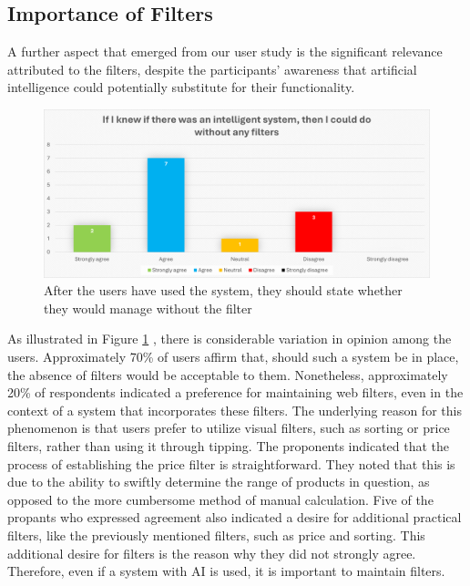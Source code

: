 \documentclass[../../submission.tex]{subfiles}
\begin{document}
 \subsection{Importance of Filters}
A further aspect that emerged from our user study is the significant relevance 
attributed to the filters, despite the participants' awareness that artificial 
intelligence could potentially substitute for their functionality.

 \begin{figure}[h]
    \includegraphics[width=\textwidth]{images/without_filter}
    \caption{After the users have used the system, they should state whether they would manage without the filter}
    \Description{}
    \label{fig:without_filter}
 \end{figure}

 As illustrated in Figure \ref{fig:without_filter} , there is considerable variation in opinion among 
 the users. Approximately 70\% of users affirm that, should such a system be 
 in place, the absence of filters would be acceptable to them. Nonetheless, 
 approximately 20\% of respondents indicated a preference for maintaining web 
 filters, even in the context of a system that incorporates these filters. 
 The underlying reason for this phenomenon is that users prefer to utilize visual 
 filters, such as sorting or price filters, rather than using it through tipping. 
 The proponents indicated that the process of establishing the price filter is 
 straightforward. They noted that this is due to the ability to swiftly determine 
 the range of products in question, as opposed to the more cumbersome method of 
 manual calculation. Five of the propants who expressed agreement also indicated 
 a desire for additional practical filters, like the previously mentioned filters, 
 such as price and sorting. This additional desire for filters is the reason why 
 they did not strongly agree. Therefore, even if a system with AI is used, it is 
 important to maintain filters.
\end{document}
